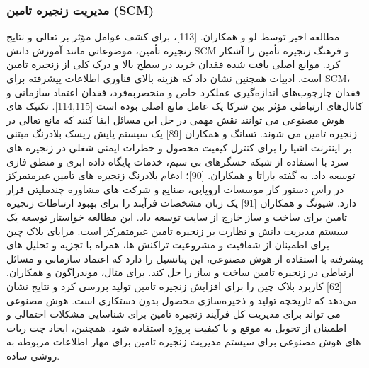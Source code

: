 \documentclass[towcolumn, 11pt]{Article}
\begin{document}
\begin{چکیده}
\subsubsection{مدیریت زنجیره تامین (SCM)}
مطالعه اخیر توسط لو و همکاران. [113]، برای کشف عوامل مؤثر بر تعالی و نتایج زنجیره تأمین، موضوعاتی مانند آموزش دانش SCM و فرهنگ زنجیره تأمین را آشکار کرد. موانع اصلی یافت شده فقدان خرید در سطح بالا و درک کلی از زنجیره تامین است. ادبیات همچنین نشان داد که هزینه بالای فناوری اطلاعات پیشرفته برای SCM، فقدان چارچوب‌های اندازه‌گیری عملکرد خاص و منحصربه‌فرد، فقدان اعتماد سازمانی و کانال‌های ارتباطی مؤثر بین شرکا یک عامل مانع اصلی بوده است [114,115]. تکنیک های هوش مصنوعی می توانند نقش مهمی در حل این مسائل ایفا کنند که مانع تعالی در زنجیره تامین می شوند.
تسانگ و همکاران [89] یک سیستم پایش ریسک بلادرنگ مبتنی بر اینترنت اشیا را برای کنترل کیفیت محصول و خطرات ایمنی شغلی در زنجیره های سرد با استفاده از شبکه حسگرهای بی سیم، خدمات پایگاه داده ابری و منطق فازی توسعه داد. به گفته باراتا و همکاران. [90]؛ ادغام بلادرنگ زنجیره های تامین غیرمتمرکز در راس دستور کار موسسات اروپایی، صنایع و شرکت های مشاوره چندملیتی قرار دارد. شیونگ و همکاران [91] یک زبان مشخصات فرآیند را برای بهبود ارتباطات زنجیره تامین برای ساخت و ساز خارج از سایت توسعه داد.
این مطالعه خواستار توسعه یک سیستم مدیریت دانش و نظارت بر زنجیره تامین غیرمتمرکز است. مزایای بلاک چین برای اطمینان از شفافیت و مشروعیت تراکنش ها، همراه با تجزیه و تحلیل های پیشرفته با استفاده از هوش مصنوعی، این پتانسیل را دارد که اعتماد سازمانی و مسائل ارتباطی در زنجیره تامین ساخت و ساز را حل کند. برای مثال، موندراگون و همکاران. [62] کاربرد بلاک چین را برای افزایش زنجیره تامین تولید بررسی کرد و نتایج نشان می‌دهد که تاریخچه تولید و ذخیره‌سازی محصول بدون دستکاری است. هوش مصنوعی می تواند برای مدیریت کل فرآیند زنجیره تامین برای شناسایی مشکلات احتمالی و اطمینان از تحویل به موقع و با کیفیت پروژه استفاده شود. همچنین، ایجاد چت ربات های هوش مصنوعی برای سیستم مدیریت زنجیره تامین برای مهار اطلاعات مربوطه به روشی ساده.


\end{چکیده}
\end{document}
